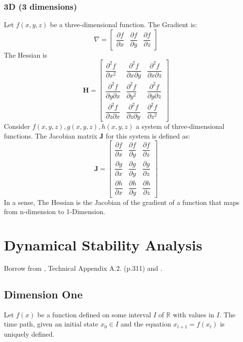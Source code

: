 \documentclass[11pt,a4paper]{book}
\theoremstyle{definition}\newtheorem{definition}{Definition}
\theoremstyle{definition}\newtheorem{fact}{Fact}
\theoremstyle{definition}\newtheorem{remark}{Remark}
\theoremstyle{definition}\newtheorem{ex}{Ex.}
\theoremstyle{definition}\newtheorem{project}{Project}
\theoremstyle{definition}\newtheorem{problem}{Problem}
\theoremstyle{definition}\newtheorem{example}{Example}
\numberwithin{theorem}{section}
\numberwithin{corollary}{chapter}
\numberwithin{assumption}{chapter}
\numberwithin{definition}{chapter}
\numberwithin{prop}{chapter}
\numberwithin{notation}{chapter}
\numberwithin{problem}{chapter}
\numberwithin{example}{chapter}
\numberwithin{fact}{chapter}
\numberwithin{ex}{chapter}
\def\R{\mathbb R}
\def\R{\mathbb R}
\def\H{\mathbf H}
\begin{document}
\begin{appendices}
	\subsection*{3D (3 dimensions)}
	Let \( f(x, y, z) \) be a three-dimensional function. The Gradient is:
	\[
	\nabla =
	\begin{bmatrix}
		\dfrac{\partial f}{\partial x} & \dfrac{\partial f}{\partial y} & \dfrac{\partial f}{\partial z}
	\end{bmatrix}
	\]
	The Hessian is
	\[
	\H = \begin{bmatrix}
		\dfrac{\partial^2 f}{\partial x^2} & \dfrac{\partial^2 f}{\partial x \partial y} & \dfrac{\partial^2 f}{\partial x \partial z} \\
		\dfrac{\partial^2 f}{\partial y \partial x} & \dfrac{\partial^2 f}{\partial y^2} & \dfrac{\partial^2 f}{\partial y \partial z} \\
		\dfrac{\partial^2 f}{\partial z \partial x} & \dfrac{\partial^2 f}{\partial z \partial y} & \dfrac{\partial^2 f}{\partial z^2}
	\end{bmatrix}
	\]	
	Consider $f(x, y, z), g(x, y, z), h(x, y, z)$ a system of three-dimensional functions. The Jacobian matrix \( \mathbf{J} \) for this system is defined as:
	\[
	\mathbf{J} =
	\begin{bmatrix}
		\dfrac{\partial f}{\partial x} & \dfrac{\partial f}{\partial y} & \dfrac{\partial f}{\partial z} \\
		\dfrac{\partial g}{\partial x} & \dfrac{\partial g}{\partial y} & \dfrac{\partial g}{\partial z} \\
		\dfrac{\partial h}{\partial x} & \dfrac{\partial h}{\partial y} & \dfrac{\partial h}{\partial z}
	\end{bmatrix}
	\]
	In a sense, The Hessian is the Jacobian of the gradient of a function that maps from n-dimension to 1-Dimension.
	
	\chapter{Dynamical Stability Analysis}
	Borrow from \citet{de2002theory}, Technical Appendix A.2. (p.311) and \citet{dannan2003stability}.
	\section{Dimension One}
	Let $f(x)$ be a function defined on some interval $I$ of $\R$ with values in $I$. The time path, given an initial state $x_0 \in I$ and the equation $x_{t+1} = f(x_t)$ is uniquely defined.
	

\end{appendices}
\end{document}
